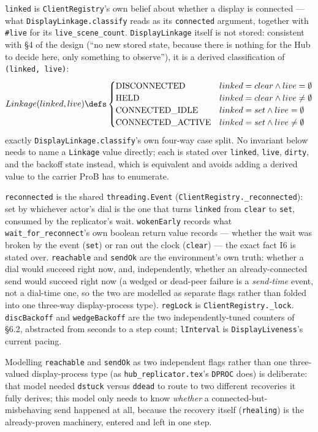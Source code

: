 \documentclass[a4paper,10pt,fleqn]{article}
\begin{document}
\texttt{linked} is \texttt{ClientRegistry}'s own belief about whether a
display is connected --- what \texttt{DisplayLinkage.classify} reads as its
\texttt{connected} argument, together with \texttt{\#live} for its
\texttt{live\_scene\_count}.  \texttt{DisplayLinkage} itself is not stored:
consistent with \S4 of the design (``no new stored state, because there is
nothing for the Hub to decide here, only something to observe''), it is a
derived classification of \texttt{(linked, live)}:
\[
  Linkage(linked, live) \defs
  \begin{cases}
    \mathrm{DISCONNECTED} & linked = clear \land live = \emptyset \\
    \mathrm{HELD} & linked = clear \land live \neq \emptyset \\
    \mathrm{CONNECTED\_IDLE} & linked = set \land live = \emptyset \\
    \mathrm{CONNECTED\_ACTIVE} & linked = set \land live \neq \emptyset
  \end{cases}
\]
exactly \texttt{DisplayLinkage.classify}'s own four-way case split.  No
invariant below needs to name a \texttt{Linkage} value directly; each is
stated over \texttt{linked}, \texttt{live}, \texttt{dirty}, and the backoff
state instead, which is equivalent and avoids adding a derived value to the
carrier ProB has to enumerate.

\texttt{reconnected} is the shared \texttt{threading.Event}
(\texttt{ClientRegistry.\_reconnected}): set by whichever actor's dial is
the one that turns \texttt{linked} from \texttt{clear} to \texttt{set},
consumed by the replicator's wait.  \texttt{wokenEarly} records what
\texttt{wait\_for\_reconnect}'s own boolean return value records --- whether
the wait was broken by the event (\texttt{set}) or ran out the clock
(\texttt{clear}) --- the exact fact I6 is stated over.  \texttt{reachable}
and \texttt{sendOk} are the environment's own truth: whether a dial would
succeed right now, and, independently, whether an already-connected send
would succeed right now (a wedged or dead-peer failure is a \emph{send-time}
event, not a dial-time one, so the two are modelled as separate flags rather
than folded into one three-way display-process type).  \texttt{regLock} is
\texttt{ClientRegistry.\_lock}. \texttt{discBackoff} and
\texttt{wedgeBackoff} are the two independently-tuned counters of \S6.2,
abstracted from seconds to a step count; \texttt{lInterval} is
\texttt{DisplayLiveness}'s current pacing.

Modelling \texttt{reachable} and \texttt{sendOk} as two independent flags
rather than one three-valued display-process type (as
\texttt{hub\_replicator.tex}'s \texttt{DPROC} does) is deliberate: that
model needed \texttt{dstuck} versus \texttt{ddead} to route to two different
recoveries it fully derives; this model only needs to know \emph{whether}
a connected-but-misbehaving send happened at all, because the recovery
itself (\texttt{rhealing}) is the already-proven machinery, entered and left
in one step.
\end{document}
